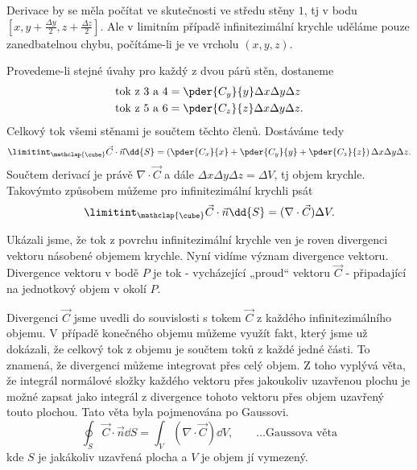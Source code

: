     Derivace by se měla počítat ve skutečnosti ve středu stěny $1$, tj v bodu $[x, y+\frac{\Delta 
    y}{2}, z + \frac{\Delta z}{2}]$. Ale v limitním případě infinitezimální krychle uděláme pouze 
    zanedbatelnou chybu, počítáme-li je ve vrcholu $(x,y,z)$.
    
    Provedeme-li stejné úvahy pro každý z dvou párů stěn, dostaneme    
    \begin{align*}
     \text{tok z 3 a 4} &= \pder{C_y}{y}\Delta x\Delta y\Delta z   \\ 
     \text{tok z 5 a 6} &= \pder{C_z}{z}\Delta x\Delta y\Delta z.
    \end{align*}       
    Celkový tok všemi stěnami je součtem těchto členů. Dostáváme tedy
    \begin{equation}
     \limitint_{\mathclap{\substack{\cube}}}\vec{C}\cdot\vec{n}\dd{S}
        = \left(\pder{C_x}{x}+\pder{C_y}{y} +
          \pder{C_z}{z}\right)\Delta x\Delta y \Delta z.
    \end{equation}
    Součtem derivací je právě $\nabla\cdot\vec{C}$ a dále $\Delta x\Delta y \Delta z = \Delta V$, 
    tj objem krychle. Takovýmto způsobem můžeme pro infinitezimální krychli psát
    \begin{equation}
      \limitint_{\mathclap{\substack{\cube}}}\vec{C}\cdot\vec{n}\dd{S}
       = (\nabla\cdot\vec{C})\Delta V.       \label{fyz:eq_gauss1}
    \end{equation}
    
    Ukázali jsme, že tok z povrchu infinitezimální krychle ven je roven divergenci vektoru násobené 
    objemem krychle. Nyní vidíme význam divergence vektoru. Divergence vektoru v bodě \(P\) je tok 
    - vycházející „proud“ vektoru $\vec{C}$ - připadající na jednotkový objem v okolí \(P\).
    
    Divergenci \(\vec{C}\) jsme uvedli do souvislosti s tokem \(\vec{C}\) z každého 
    infinitezimálního objemu. V případě konečného objemu můžeme využít fakt, který jsme už 
    dokázali, že celkový tok z objemu je součtem toků z každé jedné části. To znamená, že 
    divergenci můžeme integrovat přes celý objem. Z toho vyplývá věta, že integrál normálové složky 
    každého vektoru přes jakoukoliv uzavřenou plochu je možné zapsat jako integrál z divergence 
    tohoto vektoru přes objem uzavřený touto plochou. Tato věta byla pojmenována po Gaussovi.
    \begin{equation}\label{fyz:eq_gauss_veta}
     \oint_S \vec{C}\cdot\vec{n}\dd{S} 
       = \int_V (\nabla\cdot\vec{C})\dd{V}, \qquad\ldots\text{Gaussova věta}
    \end{equation}
    kde $S$ je jakákoliv uzavřená plocha a $V$ je objem jí vymezený.
    
